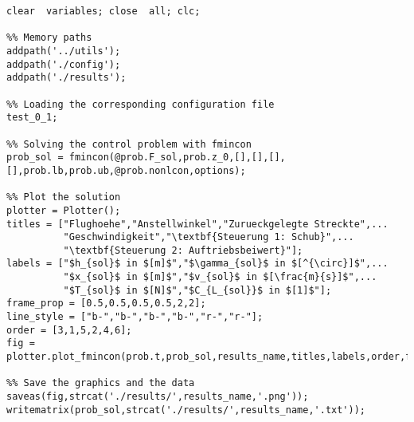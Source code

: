 \begin{lstlisting}[style=num_octave, caption={Matlab Programmcode von \texttt{main.m}.}, label=code:direct_main]
clear  variables; close  all; clc;

%% Memory paths
addpath('../utils');
addpath('./config');
addpath('./results');

%% Loading the corresponding configuration file
test_0_1;

%% Solving the control problem with fmincon
prob_sol = fmincon(@prob.F_sol,prob.z_0,[],[],[],[],prob.lb,prob.ub,@prob.nonlcon,options);

%% Plot the solution
plotter = Plotter();
titles = ["Flughoehe","Anstellwinkel","Zurueckgelegte Streckte",...
          "Geschwindigkeit","\textbf{Steuerung 1: Schub}",...
          "\textbf{Steuerung 2: Auftriebsbeiwert}"];
labels = ["$h_{sol}$ in $[m]$","$\gamma_{sol}$ in $[^{\circ}]$",...
          "$x_{sol}$ in $[m]$","$v_{sol}$ in $[\frac{m}{s}]$",...
          "$T_{sol}$ in $[N]$","$C_{L_{sol}}$ in $[1]$"];
frame_prop = [0.5,0.5,0.5,0.5,2,2];
line_style = ["b-","b-","b-","b-","r-","r-"];
order = [3,1,5,2,4,6];
fig = plotter.plot_fmincon(prob.t,prob_sol,results_name,titles,labels,order,frame_prop,line_style);

%% Save the graphics and the data
saveas(fig,strcat('./results/',results_name,'.png'));
writematrix(prob_sol,strcat('./results/',results_name,'.txt'));
\end{lstlisting}

